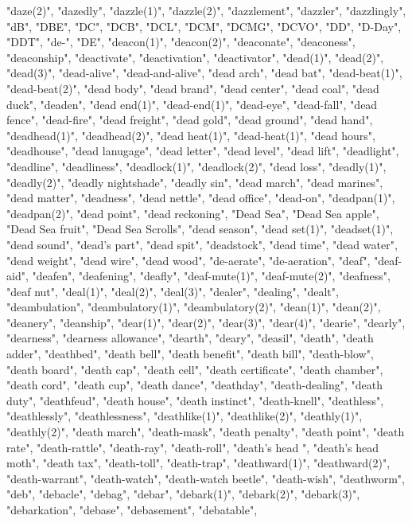 "daze(2)",
"dazedly",
"dazzle(1)",
"dazzle(2)",
"dazzlement",
"dazzler",
"dazzlingly",
"dB",
"DBE",
"DC",
"DCB",
"DCL",
"DCM",
"DCMG",
"DCVO",
"DD",
"D-Day",
"DDT",
"de-",
"DE",
"deacon(1)",
"deacon(2)",
"deaconate",
"deaconess",
"deaconship",
"deactivate",
"deactivation",
"deactivator",
"dead(1)",
"dead(2)",
"dead(3)",
"dead-alive",
"dead-and-alive",
"dead arch",
"dead bat",
"dead-beat(1)",
"dead-beat(2)",
"dead body",
"dead brand",
"dead center",
"dead coal",
"dead duck",
"deaden",
"dead end(1)",
"dead-end(1)",
"dead-eye",
"dead-fall",
"dead fence",
"dead-fire",
"dead freight",
"dead gold",
"dead ground",
"dead hand",
"deadhead(1)",
"deadhead(2)",
"dead heat(1)",
"dead-heat(1)",
"dead hours",
"deadhouse",
"dead lanugage",
"dead letter",
"dead level",
"dead lift",
"deadlight",
"deadline",
"deadliness",
"deadlock(1)",
"deadlock(2)",
"dead loss",
"deadly(1)",
"deadly(2)",
"deadly nightshade",
"deadly sin",
"dead march",
"dead marines",
"dead matter",
"deadness",
"dead nettle",
"dead office",
"dead-on",
"deadpan(1)",
"deadpan(2)",
"dead point",
"dead reckoning",
"Dead Sea",
"Dead Sea apple",
"Dead Sea fruit",
"Dead Sea Scrolls",
"dead season",
"dead set(1)",
"deadset(1)",
"dead sound",
"dead's part",
"dead spit",
"deadstock",
"dead time",
"dead water",
"dead weight",
"dead wire",
"dead wood",
"de-aerate",
"de-aeration",
"deaf",
"deaf-aid",
"deafen",
"deafening",
"deafly",
"deaf-mute(1)",
"deaf-mute(2)",
"deafness",
"deaf nut",
"deal(1)",
"deal(2)",
"deal(3)",
"dealer",
"dealing",
"dealt",
"deambulation",
"deambulatory(1)",
"deambulatory(2)",
"dean(1)",
"dean(2)",
"deanery",
"deanship",
"dear(1)",
"dear(2)",
"dear(3)",
"dear(4)",
"dearie",
"dearly",
"dearness",
"dearness allowance",
"dearth",
"deary",
"deasil",
"death",
"death adder",
"deathbed",
"death bell",
"death benefit",
"death bill",
"death-blow",
"death board",
"death cap",
"death cell",
"death certificate",
"death chamber",
"death cord",
"death cup",
"death dance",
"deathday",
"death-dealing",
"death duty",
"deathfeud",
"death house",
"death instinct",
"death-knell",
"deathless",
"deathlessly",
"deathlessness",
"deathlike(1)",
"deathlike(2)",
"deathly(1)",
"deathly(2)",
"death march",
"death-mask",
"death penalty",
"death point",
"death rate",
"death-rattle",
"death-ray",
"death-roll",
"death's head ",
"death's head moth",
"death tax",
"death-toll",
"death-trap",
"deathward(1)",
"deathward(2)",
"death-warrant",
"death-watch",
"death-watch beetle",
"death-wish",
"deathworm",
"deb",
"debacle",
"debag",
"debar",
"debark(1)",
"debark(2)",
"debark(3)",
"debarkation",
"debase",
"debasement",
"debatable",
